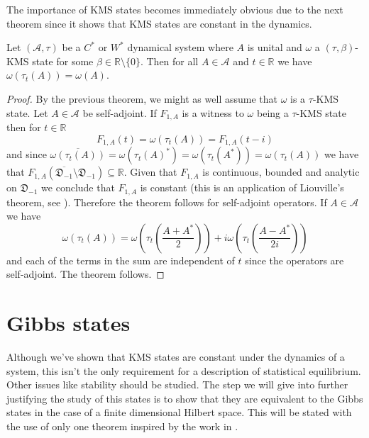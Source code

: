 The importance of KMS states becomes immediately obvious due to the next theorem since it shows that KMS states are constant in the dynamics.

\begin{theorem}\label{thm:time_invariance}
Let $(\mathcal{A},\tau)$ be a $C^*$ or $W^*$ dynamical system where $A$ is unital and $\omega$ a $(\tau,\beta)$-KMS state for some $\beta\in\mathbb{R}\setminus\{0\}$. Then for all $A\in\mathcal{A}$ and $t\in\mathbb{R}$ we have $\omega(\tau_t(A))=\omega(A)$.
\end{theorem}

\begin{proof}
By the previous theorem, we might as well assume that $\omega$ is a $\tau$-KMS state. Let $A\in\mathcal{A}$ be self-adjoint. If $F_{1,A}$ is a witness to $\omega$ being a $\tau$-KMS state then for $t\in\mathbb{R}$
\begin{equation}
F_{1,A}(t)=\omega(\tau_t(A))=F_{1,A}(t-i)
\end{equation}
and since $\overline{\omega(\tau_t(A))}=\omega(\tau_t(A)^*)=\omega(\tau_t(A^*))=\omega(\tau_t(A))$ we have that $F_{1,A}(\overline{\mathfrak{D}_{-1}}\setminus\mathfrak{D}_{-1})\subseteq\mathbb{R}$. Given that $F_{1,A}$ is continuous, bounded and analytic on $\mathfrak{D}_{-1}$ we conclude that $F_{1,A}$ is constant (this is an application of Liouville's theorem, see \cite{Duvenhage1999}). Therefore the theorem follows for self-adjoint operators.
If $A\in\mathcal{A}$ we have
\begin{equation}
\omega(\tau_t(A))=\omega\left(\tau_t\left(\frac{A+A^*}{2}\right)\right)+i\omega\left(\tau_t\left(\frac{A-A^*}{2i}\right)\right)
\end{equation}
and each of the terms in the sum are independent of $t$ since the operators are self-adjoint. The theorem follows.
\end{proof}

\section{Gibbs states}

Although we've shown that KMS states are constant under the dynamics of a system, this isn't the only requirement for a description of statistical equilibrium. Other issues like stability should be studied. The step we will give into further justifying the study of this states is to show that they are equivalent to the Gibbs states in the case of a finite dimensional Hilbert space. This will be stated with the use of only one theorem inspired by the work in \cite{Duvenhage1999}.

